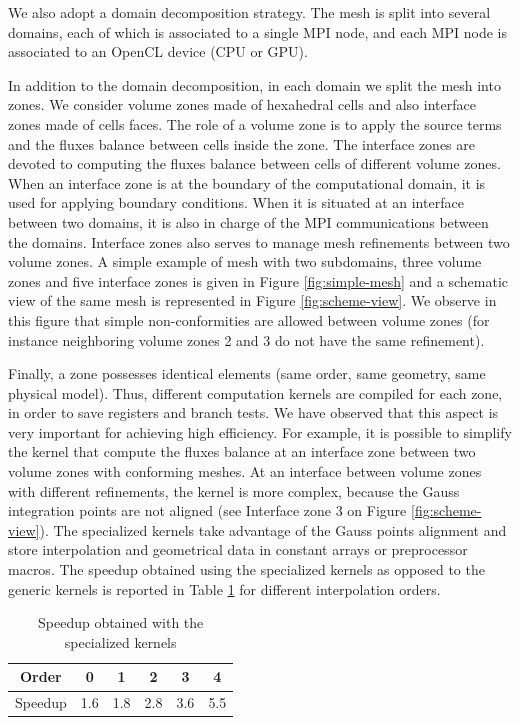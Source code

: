 \documentclass[12pt]{amsart}
\begin{document}
We also adopt a domain decomposition strategy. The mesh is split into
several domains, each of which is associated to a single MPI node, and
each MPI node is associated to an OpenCL device (CPU or GPU).

In addition to the domain decomposition, in each domain we split the mesh into zones. We consider volume zones made of hexahedral cells and also interface zones made of cells faces. The role of a volume zone is to apply the source terms and the fluxes balance between cells inside the zone. The interface zones are devoted to computing the fluxes balance between cells of different volume zones. When an interface zone is at the boundary of the computational domain, it is used for applying boundary conditions. When it is situated at an interface between two domains, it is also in charge of the MPI communications between the domains. Interface zones also serves to manage mesh refinements between two volume zones. A simple example of mesh with two subdomains, three volume zones and five interface zones is given in Figure \ref{fig:simple-mesh} and a schematic view of the same mesh is represented in Figure \ref{fig:scheme-view}. We observe in this figure that simple non-conformities are allowed between volume zones (for instance neighboring volume zones 2 and 3 do not have the same refinement).

Finally, a zone possesses identical elements (same order, same
geometry, same physical model). Thus, different computation kernels are compiled for
each zone, in order to save registers and branch tests. We have observed that this aspect is very important for achieving high efficiency. For example, it is possible to simplify the kernel that compute the fluxes balance at an interface zone between two volume zones with conforming meshes. At an interface between volume zones with different refinements, the kernel is more complex, because the Gauss integration points are not aligned (see Interface zone 3 on Figure \ref{fig:scheme-view}).
 The specialized kernels take advantage of the Gauss points alignment and store interpolation and geometrical data in
constant arrays or preprocessor macros. The speedup obtained using the specialized kernels as opposed to the generic kernels is reported
in Table \ref{tab:speedup_specialisation} for different interpolation orders.

\begin{table}[h]
  \centering
  \begin{tabular}[h]{|c||c|c|c|c|c|}
    \hline
    Order   &   0 &   1 &   2 &   3 &   4 \\ \hline
    Speedup & 1.6 & 1.8 & 2.8 & 3.6 & 5.5 \\ \hline
  \end{tabular}
  \caption{Speedup obtained with the specialized kernels}
  \label{tab:speedup_specialisation}
\end{table}
\end{document}
